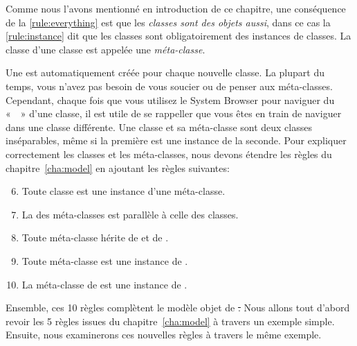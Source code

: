 \documentclass[a4paper,10pt,twoside]{book}
\begin{document}
Comme nous l'avons mentionné en introduction de ce chapitre, une conséquence de la \ref{rule:everything} est que les \emph{classes sont des objets aussi}, dans ce cas la \ref{rule:instance} dit que les classes sont obligatoirement des instances de classes.
La classe d'une classe est appelée une \emph{méta-classe}.

\label{sec:metaclassIntro}
Une  est automatiquement créée pour chaque nouvelle classe.
La plupart du temps, vous n'avez pas besoin de vous soucier ou de penser aux méta-classes.
Cependant, chaque fois que vous utilisez le System Browser pour naviguer du  «~~» d'une classe, il est utile de se rappeller que vous êtes en train de naviguer dans une classe différente.
Une classe et sa méta-classe sont deux classes inséparables, même si la première est une instance de la seconde.
Pour expliquer correctement les classes et les méta-classes, nous devons étendre les règles du chapitre~\ref{cha:model} en ajoutant les règles suivantes:

\begin{enumerate}[label={\textbf{Règle \arabic{*}}.}, ref={Règle \arabic{*}}, leftmargin=*, widest=10]
\setcounter{enumi}{5}
\item{} \label{rule:metaclass}
	Toute classe est une instance d'une méta-classe.

\item{} \label{rule:parallelhierarchy}
	La  des méta-classes est parallèle à celle des classes.

\item{} \label{rule:behavior}
	Toute méta-classe hérite de  et de .

\item{} \label{rule:metaclassclass}
	Toute méta-classe est une instance de .

\item{} \label{rule:metaclassmetaclass}
	La méta-classe de  est une instance de .

\end{enumerate}

Ensemble, ces 10 règles complètent le modèle objet de \st.
Nous allons tout d'abord revoir les 5 règles issues du chapitre~\ref{cha:model} à travers un exemple simple.
Ensuite, nous examinerons ces nouvelles règles à travers le même exemple.

\end{document}
